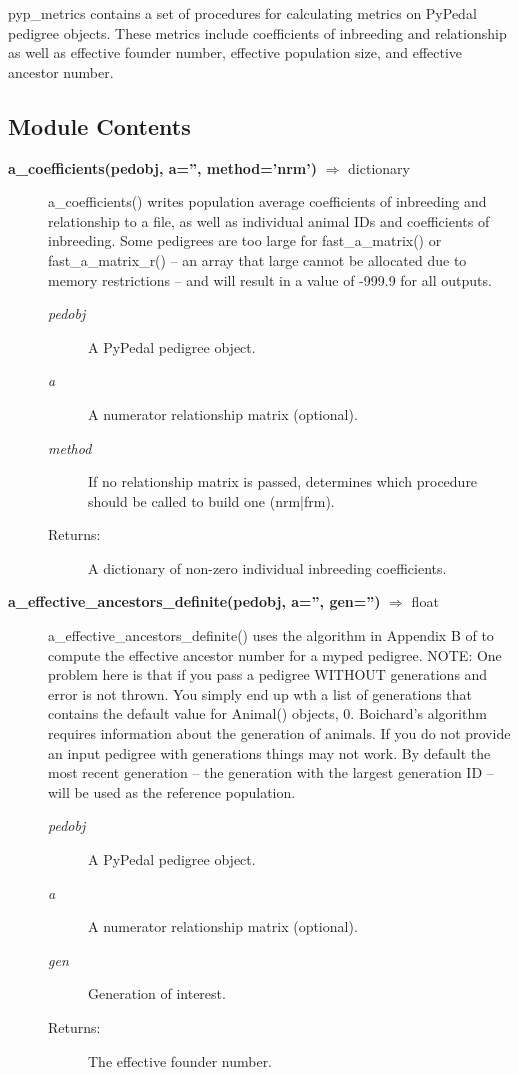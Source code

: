 pyp\_metrics contains a set of procedures for calculating metrics on PyPedal pedigree objects. These metrics include coefficients of inbreeding and relationship as well as effective founder number, effective population size, and effective ancestor number.

\subsection*{Module Contents}
\begin{description}
\item[\textbf{a\_coefficients(pedobj, a='', method='nrm')} $\Rightarrow$ dictionary]
a\_coefficients() writes population average coefficients of inbreeding and relationship to a file, as well as individual animal IDs and coefficients of inbreeding. Some pedigrees are too large for fast\_a\_matrix() or fast\_a\_matrix\_r() -- an array that large cannot be allocated due to memory restrictions -- and will result in a value of -999.9 for all outputs.
\begin{description}
\item[\emph{pedobj}] A PyPedal pedigree object.
\item[\emph{a}] A numerator relationship matrix (optional).
\item[\emph{method}] If no relationship matrix is passed, determines which procedure should be called to build one (nrm|frm).
\item[Returns:] A dictionary of non-zero individual inbreeding coefficients.
\end{description}

\item[\textbf{a\_effective\_ancestors\_definite(pedobj, a='', gen='')} $\Rightarrow$ float]
a\_effective\_ancestors\_definite() uses the algorithm in Appendix B of  to compute the effective ancestor number for a myped pedigree. NOTE: One problem here is that if you pass a pedigree WITHOUT generations and error is not thrown. You simply end up wth a list of generations that contains the default value for Animal() objects, 0. Boichard's algorithm requires information about the generation of animals. If you do not provide an input pedigree with generations things may not work. By default the most recent generation -- the generation with the largest generation ID -- will be used as the reference population.
\begin{description}
\item[\emph{pedobj}] A PyPedal pedigree object.
\item[\emph{a}] A numerator relationship matrix (optional).
\item[\emph{gen}] Generation of interest.
\item[Returns:] The effective founder number.
\end{description}


\end{description}
